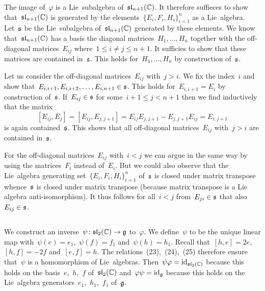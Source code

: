 The image of~$\varphi$ is a Lie~subalgebra of~$\mathfrak{sl}_{n+1}(\mathbb{C})$.
It therefore suffieces to show that~$\mathfrak{sl}_{n+1}(\mathbb{C})$ is generated by the elements~$\{E_i, F_i, H_i\}_{i=1}^n$ as a Lie~algebra.
Let~$\mathfrak{s}$ be the Lie~subalgebra of~$\mathfrak{sl}_{n+1}(\mathbb{C})$ generated by these elements.
We know that~$\mathfrak{sl}_{n+1}(\mathbb{C})$ has a basis the diagonal matrices~$H_1, \dotsc, H_n$ together with the off-diagonal matrices~$E_{ij}$ where~$1 \leq i \neq j \leq n+1$.
It sufficies to show that these matrices are contained in~$\mathfrak{s}$.
This holds for~$H_1, \dotsc, H_n$ by construction of~$\mathfrak{s}$.

Let us consider the off-diagonal matrices~$E_{ij}$ with~$j > i$.
We fix the index~$i$ and show that~$E_{i,i+1}, E_{i,i+2}, \dotsc, E_{i,n+1} \in \mathfrak{s}$.
This holds for~$E_{i,i+1} = E_i$ by construction of~$\mathfrak{s}$.
If~$E_{ij} \in \mathfrak{s}$ for some~$i+1 \leq j < n+1$ then we find inductively that the matrix
\[
  [E_{ij}, E_j]
  =
  [E_{ij}, E_{j,j+1}]
  =
  E_{ij} E_{j,j+1} - E_{j,j+1} E_{ij}
  =
  E_{i,j+1}
\]
is again contained~$\mathfrak{s}$.
This shows that all off-diagonal matrices~$E_{ij}$ with~$j > i$ are contained in~$\mathfrak{s}$.

For the off-diagonal matrices~$E_{ij}$ with~$i < j$ we can argue in the same way by using the matrices~$F_i$ instead of~$E_i$.
But we could also observe that the Lie~algebra generating set~$\{E_i, F_i, H_i\}_{i=1}^n$ of~$\mathfrak{s}$ is closed under matrix transpose whence~$\mathfrak{s}$ is closed under matrix transpose (because matrix transpose is a Lie algebra anti-isomorphism).
It thus follows for all~$i < j$ from~$E_{ji} \in \mathfrak{s}$ that also~$E_{ij} \in \mathfrak{s}$.





\subsection{}

We construct an inverse~$\psi \colon \mathfrak{sl}_2(\mathbb{C}) \to \mathfrak{g}$ to~$\varphi$.
We define~$\psi$ to be the unique linear map with~$\psi(e) = e_1$,~$\psi(f) = f_1$ and~$\psi(h) = h_1$.
Recall that~$[h,e] = 2e$,~$[h,f] = -2f$ and~$[e,f] = h$.
The relations~(23),~(24),~(25) therefore ensure that~$\psi$ is a homomorphism of Lie~algebras.
Then~$\psi \varphi = \operatorname{id}_{\mathfrak{sl}_2(\mathbb{C})}$ because this holds on the basis~$e$,~$h$,~$f$ of~$\mathfrak{sl}_2(\mathbb{C})$ and~$\varphi \psi = \operatorname{id}_{\mathfrak{g}}$ because this holds on the Lie~algebra generators~$e_1$,~$h_1$,~$f_1$ of~$\mathfrak{g}$.



